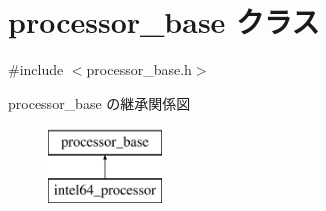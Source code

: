 \hypertarget{classprocessor__base}{}\section{processor\+\_\+base クラス}
\label{classprocessor__base}


{\ttfamily \#include $<$processor\+\_\+base.\+h$>$}

processor\+\_\+base の継承関係図\begin{figure}[H]
\begin{center}
\leavevmode
\includegraphics[height=2.000000cm]{classprocessor__base}
\end{center}
\end{figure}
